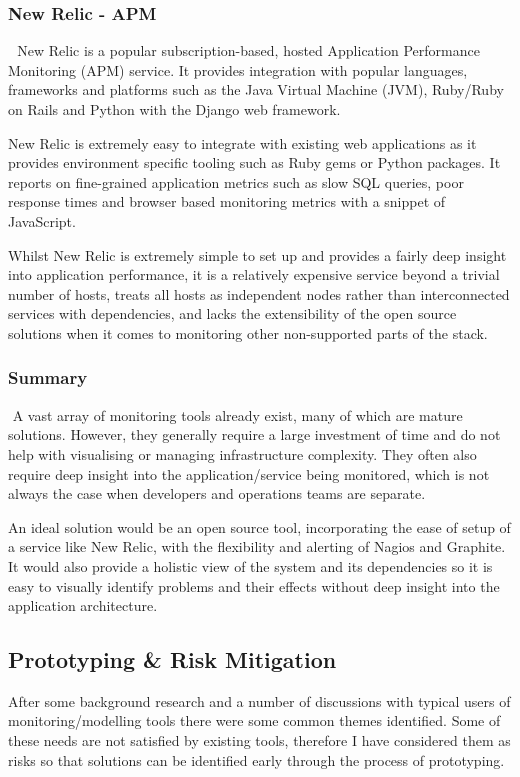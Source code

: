 \documentclass{cshonours}
\begin{document}
\subsubsection{New Relic - APM} 
New Relic is a popular subscription-based, hosted Application Performance Monitoring (APM) service. It provides integration with popular languages, frameworks and platforms such as the Java Virtual Machine (JVM), Ruby/Ruby on Rails and Python with the Django web framework.

New Relic is extremely easy to integrate with existing web applications as it provides environment specific tooling such as Ruby gems or Python packages. It reports on fine-grained application metrics such as slow SQL queries, poor response times and browser based monitoring metrics with a snippet of JavaScript.

Whilst New Relic is extremely simple to set up and provides a fairly deep insight into application performance, it is a relatively expensive service beyond a trivial number of hosts, treats all hosts as independent nodes rather than interconnected services with dependencies, and lacks the extensibility of the open source solutions when it comes to monitoring other non-supported parts of the stack.

\subsubsection{Summary}
 A vast array of monitoring tools already exist, many of which are mature solutions. However, they generally require a large investment of time and do not help with visualising or managing infrastructure complexity. They often also require deep insight into the application/service being monitored, which is not always the case when developers and operations teams are separate.

An ideal solution would be an open source tool, incorporating the ease of setup of a service like New Relic, with the flexibility and alerting of Nagios and Graphite. It would also provide a holistic view of the system and its dependencies so it is easy to visually identify problems and their effects without deep insight into the application architecture.

\subsection{Prototyping \& Risk Mitigation}

After some background research and a number of discussions with typical users of monitoring/modelling tools there were some common themes identified. Some of these needs are not satisfied by existing tools, therefore I have considered them as risks so that solutions can be identified early through the process of prototyping.
\end{document}
